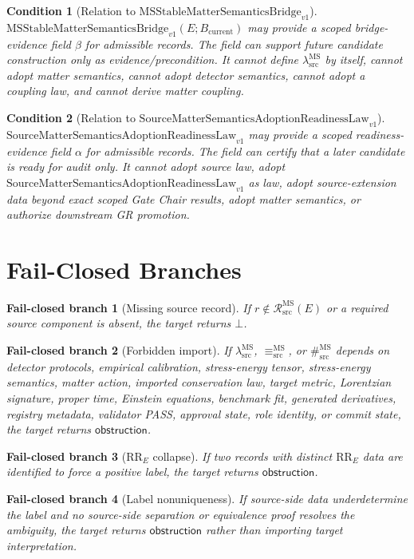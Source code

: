 \documentclass[11pt]{article}
\newcommand{\Bcur}{B_{\mathrm{current}}}
\newcommand{\MSBridge}{\mathrm{MSStableMatterSemanticsBridge}_{v1}}
\newcommand{\SMSAR}{\mathrm{SourceMatterSemanticsAdoptionReadinessLaw}_{v1}}
\newcommand{\RecSrc}{\mathcal R^{\mathrm{MS}}_{\mathrm{src}}}
\newcommand{\lambdaSrc}{\lambda^{\mathrm{MS}}_{\mathrm{src}}}
\newcommand{\EqMS}{\equiv^{\mathrm{MS}}_{\mathrm{src}}}
\newcommand{\SepMS}{\#^{\mathrm{MS}}_{\mathrm{src}}}
\newcommand{\Bottom}{\bot}
\newcommand{\Obstruction}{\mathsf{obstruction}}
\newcommand{\RRE}{\mathrm{RR}_E}
\newtheorem{condition}{Condition}
\newtheorem{failure}{Fail-closed branch}
\begin{document}
\begin{condition}[Relation to \(\MSBridge\)]
\(\MSBridge(E;\Bcur)\) may provide a scoped bridge-evidence field \(\beta\)
for admissible records. The field can support future candidate construction
only as evidence/precondition. It cannot define \(\lambdaSrc\) by itself,
cannot adopt matter semantics, cannot adopt detector semantics, cannot adopt a
coupling law, and cannot derive matter coupling.
\end{condition}

\begin{condition}[Relation to \(\SMSAR\)]
\(\SMSAR\) may provide a scoped readiness-evidence field \(\alpha\) for
admissible records. The field can certify that a later candidate is ready for
audit only. It cannot adopt source law, adopt \(\SMSAR\) as law, adopt
source-extension data beyond exact scoped Gate Chair results, adopt matter
semantics, or authorize downstream GR promotion.
\end{condition}

\section{Fail-Closed Branches}

\begin{failure}[Missing source record]
If \(r\notin\RecSrc(E)\) or a required source component is absent, the target
returns \(\Bottom\).
\end{failure}

\begin{failure}[Forbidden import]
If \(\lambdaSrc\), \(\EqMS\), or \(\SepMS\) depends on detector protocols,
empirical calibration, stress-energy tensor, stress-energy semantics, matter
action, imported conservation law, target metric, Lorentzian signature, proper
time, Einstein equations, benchmark fit, generated derivatives, registry
metadata, validator PASS, approval state, role identity, or commit state, the
target returns \(\Obstruction\).
\end{failure}

\begin{failure}[\(\RRE\) collapse]
If two records with distinct \(\RRE\) data are identified to force a positive
label, the target returns \(\Obstruction\).
\end{failure}

\begin{failure}[Label nonuniqueness]
If source-side data underdetermine the label and no source-side separation or
equivalence proof resolves the ambiguity, the target returns
\(\Obstruction\) rather than importing target interpretation.
\end{failure}
\end{document}
